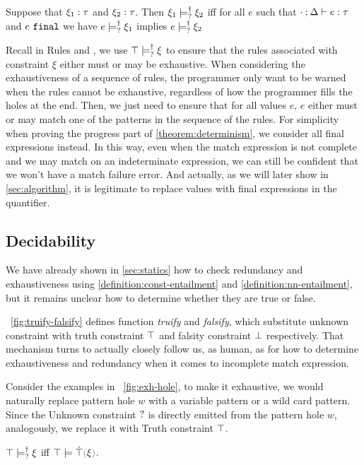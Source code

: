 \begin{definition}
  \label{definition:nn-entailment}
  Suppose that $\xi_1 : \tau$ and $\xi_2 : \tau$. Then $\xi_1 \models_{?}^{\dag} \xi_2$ iff for all $e$ such that $\cdot \mathbin{;} \Delta \vdash e : \tau$ and $e ~\mathtt{final}$ we have $e \models_{?}^{\dag} \xi_1$ implies $e \models_{?}^{\dag} \xi_2$ 
\end{definition}

Recall in Rules \TMatchZPre and \TMatchNZPre, we use $\top \models_{?}^{\dag} \xi$ to ensure that the rules associated with constraint $\xi$ either must or may be exhaustive. When considering the exhaustiveness of a sequence of rules, the programmer only want to be warned when the rules cannot be exhaustive, regardless of how the programmer fills the holes at the end. Then, we just need to ensure that for all values $e$, $e$ either must or may match one of the patterns in the sequence of the rules. For simplicity when proving the progress part of  \autoref{theorem:determinism}, we consider all final expressions instead. In this way, even when the match expression is not complete and we may match on an indeterminate expression, we can still be confident that we won't have a match failure error. And actually, as we will later show in \autoref{sec:algorithm}, it is legitimate to replace values with final expressions in the quantifier.

\subsection{Decidability}\label{sec:algorithm}

We have already shown in \autoref{sec:statics} how to check redundancy and
exhaustiveness using \autoref{definition:const-entailment} and
\autoref{definition:nn-entailment}, but it remains unclear how to
determine whether they are true or false.



\figurename~\ref{fig:truify-falsify} defines function \textit{truify} and \textit{falsify},
which substitute unknown constraint with truth constraint $\top$ and falsity
constraint $\bot$ respectively. That mechanism turns to actually closely follow us, as human, as for how to determine exhaustiveness and redundancy when it comes to incomplete match expression.

Consider the examples in \figurename~\ref{fig:exh-hole}, to make it exhaustive, we would naturally replace pattern hole $w$ with a variable pattern or a wild card pattern. Since the Unknown constraint $\mathtt{?}$ is directly emitted from the pattern hole $w$, analogously, we replace it with Truth constraint $\top$.
\begin{theorem}
\label{theorem:exhaustive-truify}
  $\top \models_{?}^{\dag} \xi$ iff $\csatisfy{\ctruth}{\ctruify{\xi}}$.
\end{theorem}

